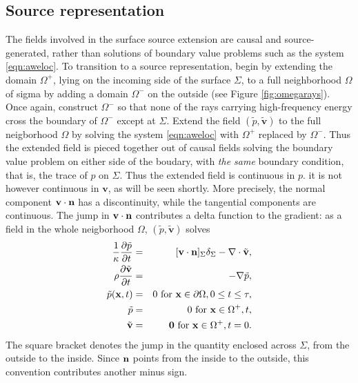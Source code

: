 \documentclass[georeport,12pt]{geophysics}
\newcommand{\bx}{\mathbf{x}}
\newcommand{\bv}{\mathbf{v}}
\begin{document}
\subsection{Source representation}

The fields involved in the surface source extension are causal and
source-generated, rather than solutions of boundary value problems
such as the system \ref{eqn:aweloc}. To transition to a source
representation, begin by extending the domain $\Omega^+$, lying on the
incoming side of the surface $\Sigma$, to a full neighborhood $\Omega$
of sigma
by adding a domain $\Omega^-$ on the outside (see Figure
\ref{fig:omegarays}). Once again, construct $\Omega^-$ so that none of
the rays carrying high-frequency energy cross the boundary of
$\Omega^-$ except at $\Sigma$. Extend the field $(\tilde{p},\tilde{\bv})$ to the
full neigborhood $\Omega$ by solving the system \ref{eqn:aweloc} with
$\Omega^+$ replaced by $\Omega^-$. Thus the extended
field is pieced together out of causal fields solving the boundary value
problem on either side of the boudary, with {\em the same} boundary
condition, that is, the trace of $p$ on $\Sigma$. Thus the extended
field is continuous in $p$. it is not however continuous in
$\bv$, as will be seen shortly. More precisely, the normal component
$\bv\cdot {\bf n}$
has a discontinuity, while the tangential components are continuous.
The jump in
$\bv\cdot {\bf n}$ contributes a delta function to the gradient: as a
field in the whole neigborhood $\Omega$, $(\tilde{p},\tilde{\bv})$
solves
\begin{eqnarray}
\label{eqn:awebase}
  \frac{1}{\kappa}\frac{\partial \tilde{p}}{\partial t} & = & [\bv \cdot {\bf n}]_{\Sigma}\delta_{\Sigma}
                                                      - \nabla \cdot \tilde{\bv}, \nonumber \\
  \rho\frac{\partial \tilde{\bv}}{\partial t} & = & - \nabla \tilde{p}, \nonumber \\
  \tilde{p}(\bx,t) & = & 0 \mbox{ for } \bx \in \partial \Omega, 0 \le t \le 
  \tau, \nonumber \\
  \tilde{p} & = & 0 \mbox{ for } \bx \in \Omega^+, t , \nonumber \\
  \tilde{\bv} & = & {\bf 0} \mbox{ for } \bx \in \Omega^+, t = 0.       
\end{eqnarray}
The square bracket denotes the jump in the quantity enclosed across
$\Sigma$, from the outside to the inside. Since ${\bf n}$ points from
the inside to the outside, this convention contributes another minus
sign.
\end{document}
